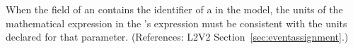 When the  field of an \EventAssignment
contains the identifier of a \Parameter in the model, the
units of the mathematical expression in the
\EventAssignment's  expression must be
consistent with the units declared for that parameter.
(References: L2V2 Section~\ref{sec:eventassignment}.)
